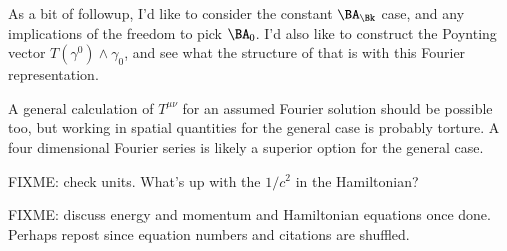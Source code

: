 As a bit of followup, I'd like to consider the constant $\BA_\Bk$ case, and any implications of the freedom to pick $\BA_0$.  I'd also like to construct the Poynting vector $T(\gamma^0) \wedge \gamma_0$, and see what the structure of that is with this Fourier representation.

A general calculation of $T^{\mu\nu}$ for an assumed Fourier solution should be possible too, but working in spatial quantities for the general case is probably torture.  A four dimensional Fourier series is likely a superior option for the general case.

FIXME: check units.  What's up with the $1/c^2$ in the Hamiltonian?

FIXME: discuss energy and momentum and Hamiltonian equations once done.  Perhaps repost since equation numbers and citations are shuffled.

\EndArticle

